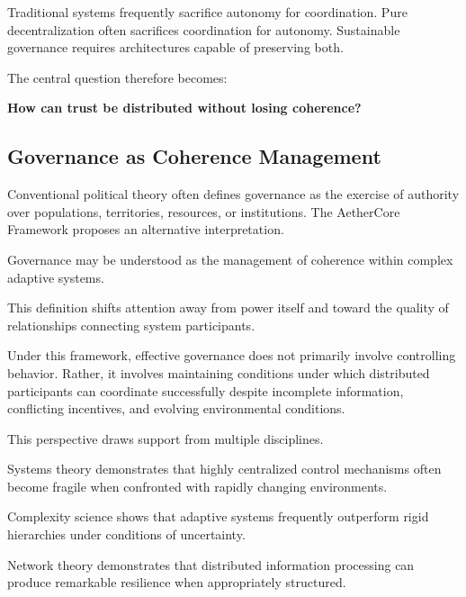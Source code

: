\documentclass[12pt]{article}
\begin{document}
Traditional systems frequently sacrifice autonomy for coordination. Pure decentralization often sacrifices coordination for autonomy. Sustainable governance requires architectures capable of preserving both.

The central question therefore becomes:

\begin{center}
\textbf{How can trust be distributed without losing coherence?}
\end{center}


\subsection{Governance as Coherence Management}

Conventional political theory often defines governance as the exercise of authority over populations, territories, resources, or institutions. The AetherCore Framework proposes an alternative interpretation.

Governance may be understood as the management of coherence within complex adaptive systems.

This definition shifts attention away from power itself and toward the quality of relationships connecting system participants.

Under this framework, effective governance does not primarily involve controlling behavior. Rather, it involves maintaining conditions under which distributed participants can coordinate successfully despite incomplete information, conflicting incentives, and evolving environmental conditions.

This perspective draws support from multiple disciplines.

Systems theory demonstrates that highly centralized control mechanisms often become fragile when confronted with rapidly changing environments.

Complexity science shows that adaptive systems frequently outperform rigid hierarchies under conditions of uncertainty.

Network theory demonstrates that distributed information processing can produce remarkable resilience when appropriately structured.
\end{document}
